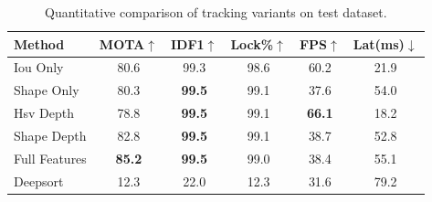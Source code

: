 \begin{table}[t]
\centering
\caption{Quantitative comparison of tracking variants on test dataset.}
\label{tab:results}
\begin{tabular}{l|ccc|cc}
\hline
Method & MOTA$\uparrow$ & IDF1$\uparrow$ & Lock\%$\uparrow$ & FPS$\uparrow$ & Lat(ms)$\downarrow$ \\
\hline
Iou Only & 80.6 & 99.3 & 98.6 & 60.2 & 21.9 \\
Shape Only & 80.3 & \textbf{99.5} & 99.1 & 37.6 & 54.0 \\
Hsv Depth & 78.8 & \textbf{99.5} & 99.1 & \textbf{66.1} & 18.2 \\
Shape Depth & 82.8 & \textbf{99.5} & 99.1 & 38.7 & 52.8 \\
Full Features & \textbf{85.2} & \textbf{99.5} & 99.0 & 38.4 & 55.1 \\
Deepsort & 12.3 & 22.0 & 12.3 & 31.6 & 79.2 \\
\hline
\end{tabular}
\end{table}
